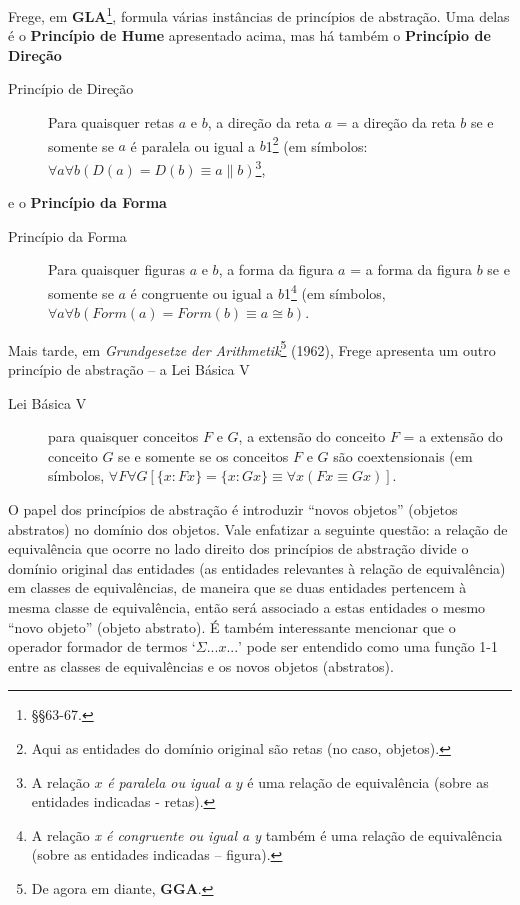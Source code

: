 Frege, em \textbf{GLA}\footnote{§§63-67.}, formula várias instâncias
de princípios de abstração. Uma delas é o \textbf{Princípio de Hume}
apresentado acima, mas há também o \textbf{Princípio de Direção}

\begin{description}

\item[Princípio de Direção]Para quaisquer retas $a$ e $b$, a
direção da reta $a$ = a direção da reta $b$ se e somente se $a$
é paralela ou igual a $b$1\footnote{Aqui as entidades do domínio original são retas (no caso, objetos). }
(em símbolos: $\forall a\forall b(D(a)=D(b)\equiv a\parallel b)$\footnote{A relação $x$ \textit{é paralela ou igual a} $y$ é uma relação de
equivalência (sobre as entidades indicadas - retas).},

\end{description}

\noindent e o \textbf{Princípio da Forma}

\begin{description}

\item[Princípio da Forma]Para quaisquer figuras $a$ e $b$, a forma
da figura $a$ = a forma da figura $b$ se e somente se $a$ é congruente
ou igual a $b$1\footnote{A relação \textit{x é congruente ou igual a y} também é uma relação
de equivalência (sobre as entidades indicadas – figura).} (em símbolos, $\forall a\forall b(Form(a)=Form(b)\equiv a\cong b)$.

\end{description}

Mais tarde, em \textit{Grundgesetze der Arithmetik}\footnote{De agora em diante, \textbf{GGA}.}
(1962\nocite{Frege1962}), Frege apresenta um outro princípio de abstração
– a Lei Básica V

\begin{description}

\item[Lei Básica V]para quaisquer conceitos $F$ e $G$, a extensão
do conceito $F$ = a extensão do conceito $G$ se e somente se os
conceitos $F$ e $G$ são coextensionais (em símbolos, $\forall F\forall G[\{x:Fx\}=\{x:Gx\}\equiv\forall x(Fx\equiv Gx)]$.

\end{description}

O papel dos princípios de abstração é introduzir “novos objetos” (objetos
abstratos) no domínio dos objetos. Vale enfatizar a seguinte questão:
a relação de equivalência que ocorre no lado direito dos princípios
de abstração divide o domínio original das entidades (as entidades
relevantes à relação de equivalência) em classes de equivalências,
de maneira que se duas entidades pertencem à mesma classe de equivalência,
então será associado a estas entidades o mesmo “novo objeto” (objeto
abstrato). É também interessante mencionar que o operador formador
de termos `$\Sigma...x...$' pode ser entendido como uma função 1-1
entre as classes de equivalências e os novos objetos (abstratos).

